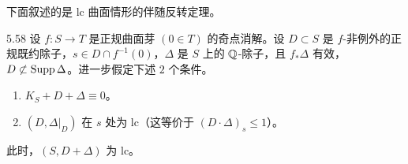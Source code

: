 
下面叙述的是 lc 曲面情形的伴随反转定理。

\begin{propositionp}{5.58}
设 $f\colon S\to T$ 是正规曲面芽 $(0\in T)$ 的奇点消解。设 $D\subset S$ 是 $f$-非例外的正规既约除子，$s\in D\cap f^{-1}(0)$，$\Delta$ 是 $S$ 上的 $\mathbb{Q}$-除子，且 $f_*\Delta$ 有效，$D\not\subset\operatorname{Supp}\Delta$。进一步假定下述 $2$ 个条件。
\begin{enumerate}[label=(\arabic*),leftmargin=*]
\item $K_S+D+\Delta\equiv0$。
\item $(D,\Delta|_D)$ 在 $s$ 处为 lc（这等价于 $(D\cdot\Delta)_s\le1$）。
\end{enumerate}
此时，$(S,D+\Delta)$ 为 lc。
\end{propositionp}
